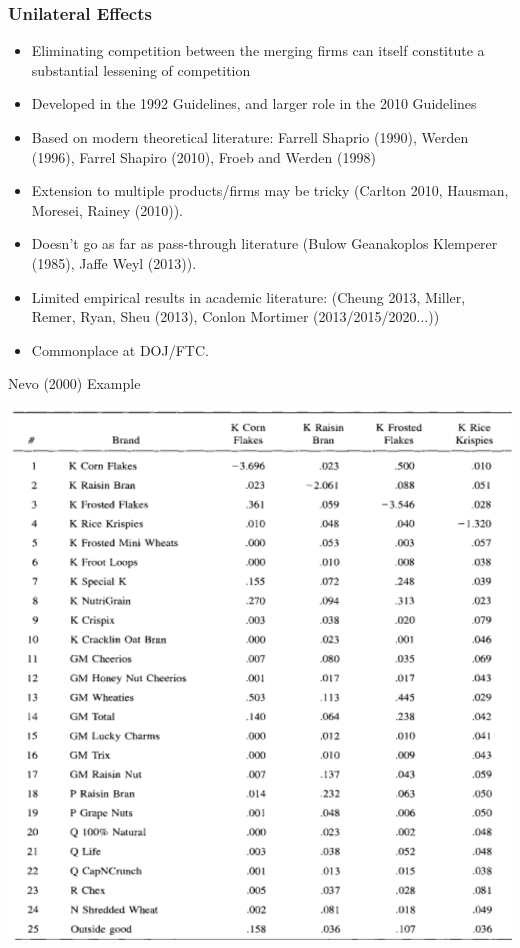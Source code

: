 \documentclass[xcolor=pdftex,dvipsnames,table,mathserif,aspectratio=169]{beamer}
\begin{document}
\begin{frame}
\frametitle{Unilateral Effects}
\begin{itemize}
\item Eliminating competition between the merging firms can itself constitute a substantial lessening of competition
\item Developed in the 1992 Guidelines, and larger role in the 2010 Guidelines
\item Based on modern theoretical literature: Farrell Shaprio (1990), Werden (1996), Farrel Shapiro (2010), Froeb and Werden (1998)
\item Extension to multiple products/firms may be tricky (Carlton 2010, Hausman, Moresei, Rainey (2010)).
\item Doesn't go as far as pass-through literature (Bulow Geanakoplos Klemperer (1985), Jaffe Weyl (2013)). 
\item Limited empirical results in academic literature: (Cheung 2013, Miller, Remer, Ryan, Sheu (2013), Conlon Mortimer (2013/2015/2020...))
\item Commonplace at DOJ/FTC.
\end{itemize} 
\end{frame}

\begin{frame}{Nevo (2000) Example}
\begin{center}
\includegraphics[height=\textheight]{./resources/nevo_elas.png}
\end{center}
\end{frame}
\end{document}
